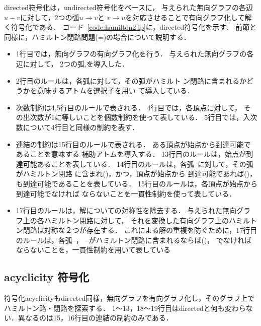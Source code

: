 \textsf{directed}符号化は，\textsf{undirected}符号化をベースに，
与えられた無向グラフの各辺$u-v$に対して，2つの弧$u\rightarrow v$と
$v\rightarrow u$を対応させることで有向グラフ化して解く符号化である．
コード~\ref{code:hamilton2.lp}に，\textsf{directed}符号化を示す．
前節と同様に，ハミルトン閉路問題(=)の場合について説明する．

\begin{itemize}
\item 1行目では，無向グラフの有向グラフ化を行う．
  与えられた無向グラフの各辺に対して，
  2つの弧,を導入した．
\item 2行目のルールは，各弧に対して，その弧がハミルト
  ン閉路に含まれるかどうかを意味するアトムを選択子を用い
  て導入している．
\item 次数制約は4,5行目のルールで表される．
  4行目では，各頂点に対して，
  その出次数が1に等しいことを個数制約を使って表している．
  5行目では，入次数について4行目と同様の制約を表す．
\item 連結の制約は15行目のルールで表される．
  ある頂点が始点から到達可能であることを意味する
  補助アトムを導入する．
  13行目のルールは，始点が到達可能あることを表している．
  14行目のルールは，各弧--に対して，その弧がハミルトン閉路
  に含まれ()，かつ，頂点が始点から
  到達可能であれば()，も到達可能であることを表している．
  15行目のルールは，各頂点が始点から到達可能でなければ
  ならないことを一貫性制約を使って表している．
\item 17行目のルールは，解についての対称性を除去する．
  与えられた無向グラフ上の各ハミルトン閉路に対して，
  それを変換した有向グラフ上のハミルトン閉路は対称な２つが存在する．
  これによる解の重複を防ぐために，17行目のルールは，各弧--，
  --がハミルトン閉路に含まれるならば()，
  でなければならないことを，一貫性制約を用いて表している
\end{itemize}

\subsection{acyclicity 符号化}


符号化acyclicityもdirected同様，無向グラフを有向グラフ化し，そのグラフ上でハミルトン路・閉路を探索する．
1〜13，18〜19行目はdirectedと何も変わらない．異なるのは15，16行目の連結の制約のみである．

